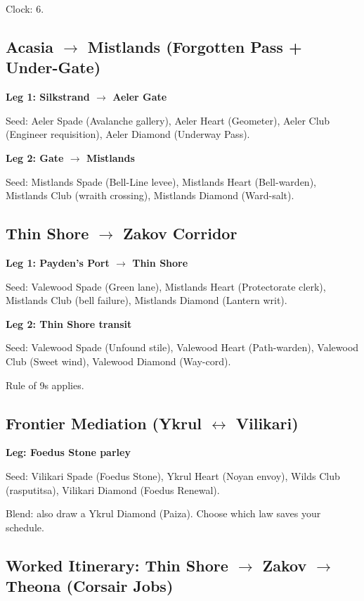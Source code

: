 \documentclass[12pt,oneside]{book}
\begin{document}
Clock: 6.

\subsection{Acasia $\rightarrow$ Mistlands (Forgotten Pass + Under-Gate)}

\textbf{Leg 1: Silkstrand $\rightarrow$ Aeler Gate}

Seed: Aeler Spade (Avalanche gallery), Aeler Heart (Geometer), Aeler Club (Engineer requisition), Aeler Diamond (Underway Pass).

\textbf{Leg 2: Gate $\rightarrow$ Mistlands}

Seed: Mistlands Spade (Bell-Line levee), Mistlands Heart (Bell-warden), Mistlands Club (wraith crossing), Mistlands Diamond (Ward-salt).

\subsection{Thin Shore $\rightarrow$ Zakov Corridor}

\textbf{Leg 1: Payden's Port $\rightarrow$ Thin Shore}

Seed: Valewood Spade (Green lane), Mistlands Heart (Protectorate clerk), Mistlands Club (bell failure), Mistlands Diamond (Lantern writ).

\textbf{Leg 2: Thin Shore transit}

Seed: Valewood Spade (Unfound stile), Valewood Heart (Path-warden), Valewood Club (Sweet wind), Valewood Diamond (Way-cord).

Rule of 9s applies.

\subsection{Frontier Mediation (Ykrul $\leftrightarrow$ Vilikari)}

\textbf{Leg: Foedus Stone parley}

Seed: Vilikari Spade (Foedus Stone), Ykrul Heart (Noyan envoy), Wilds Club (rasputitsa), Vilikari Diamond (Foedus Renewal).

Blend: also draw a Ykrul Diamond (Paiza). Choose which law saves your schedule.

\subsection{Worked Itinerary: Thin Shore $\rightarrow$ Zakov $\rightarrow$ Theona (Corsair Jobs)}
\end{document}
